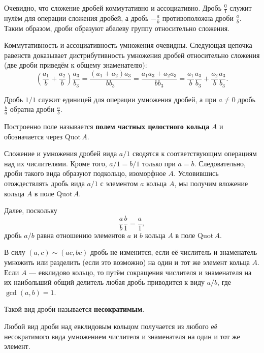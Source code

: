 Очевидно, что сложение дробей коммутативно и ассоциативно. Дробь $\frac{0}{1}$ служит нулём для операции сложения дробей, а дробь $\displaystyle -\frac{a}{b}$ противоположна дроби $\displaystyle\frac{a}{b}$. Таким образом, дроби образуют абелеву группу относительно сложения.

Коммутативность и ассоциативность умножения очевидны. Следующая цепочка равенств доказывает дистрибутивность умножения дробей относительно сложения (две дроби приведём к общему знаменателю):
$$
\left(\frac{a_1}{b} + \frac{a_2}{b}\right)\frac{a_3}{b_3} = \frac{(a_1 + a_2)a_3}{bb_3} = \frac{a_1a_3 + a_2a_3}{bb_3} = \frac{a_1}{b}\frac{a_3}{b_3} + \frac{a_2}{b}\frac{a_3}{b_3}.
$$

Дробь $1 / 1$ служит единицей для операции умножения дробей, а при $a \ne 0$ дробь $\displaystyle\frac{b}{a}$ обратна дроби $\displaystyle\frac{a}{b}$.

\begin{definition}
    Построенно поле называется \textbf{полем частных целостного кольца} $A$ и обозначается через $\mathrm{Quot}\,A$.
\end{definition}

Сложение и умножения дробей вида $a / 1$ сводятся к соответствующим операциям над их числителями. Кроме того, $a / 1 = b / 1$ только при $a = b$. Следовательно, дроби такого вида образуют подкольцо, изоморфное $A$. Условившись отождествлять дробь вида $a / 1$ с элементом $a$ кольца $A$, мы получим вложение кольца $A$ в поле $\mathrm{Quot}\,A$.

Далее, поскольку 
$$
\frac{a}{b}\frac{b}{1} = \frac{a}{1},
$$
дробь $a / b$ равна отношению элементов $a$ и $b$ кольца $A$ в поле $\mathrm{Quot}\,A$. 

В силу $(a, c) \sim (ac, bc)$ дробь не изменится, если её числитель и знаменатель умножить или разделить (если это возможно) на один и тот же элемент кольца $A$. Если $A$ --- евклидово кольцо, то путём сокращения числителя и знаменателя на их наибольший общий делитель любая дробь приводится к виду $a / b$, где $\gcd(a, b) = 1$. 

\begin{definition}
    Такой вид дроби называется \textbf{несократимым}.
\end{definition}

\begin{statement}
    Любой вид дроби над евклидовым кольцом получается из любого её несократимого вида умножением числителя и знаменателя на один и тот же элемент.
\end{statement}

